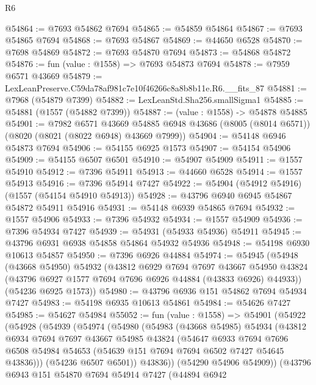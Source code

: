 \begin{lexlean}{R6}
\begin{coremodule}
@54864 := @7693 @54862 @7694
@54865 := @54859 @54864
@54867 := @7693 @54865 @7694
@54868 := @7693 @54867
@54869 := @44650 @6528
@54870 := @7698 @54869
@54872 := @7693 @54870 @7694
@54873 := @54868 @54872
@54876 := fun (value : @1558) => @7693 @54873 @7694
@54878 := @7959 @6571 @43669
@54879 := LexLeanPreserve.C59da78af981c7e10f46266c8a8b8b11e.R6.__fits_87
@54881 := @7968 (@54879 @7399)
@54882 := LexLeanStd.Sha256.smallSigma1
@54885 := @54881 (@1557 (@54882 @7399))
@54887 := (value : @1558) -> @54878 @54885
@54901 := @7982
    @6571
    @43669
    @54885
    @6948
    @43686
    (@8005 (@8014 @6571))
    (@8020 (@8021 (@8022 @6948) @43669 @7999))
@54904 := @54148 @6946 @54873 @7694
@54906 := @54155 @6925 @1573
@54907 := @54154 @54906
@54909 := @54155 @6507 @6501
@54910 := @54907 @54909
@54911 := @1557 @54910
@54912 := @7396 @54911
@54913 := @44660 @6528
@54914 := @1557 @54913
@54916 := @7396 @54914 @7427
@54922 := @54904 (@54912 @54916) (@1557 (@54154 @54910 @54913))
@54928 := @43796 @6940 @6945 @54867 @54872 @54911 @54916
@54931 := @54148 @6939 @54865 @7694
@54932 := @1557 @54906
@54933 := @7396 @54932
@54934 := @1557 @54909
@54936 := @7396 @54934 @7427
@54939 := @54931 (@54933 @54936) @54911
@54945 := @43796 @6931 @6938 @54858 @54864 @54932 @54936
@54948 := @54198 @6930 @10613 @54857
@54950 := @7396 @6926 @44884
@54974 := @54945
    (@54948
      (@43668 @54950)
      @54932
      (@43812
        @6929
        @7694
        @7697
        @43667
        @54950
        @43824
        (@43796 @6927 @1577 @7694 @7696 @6926 @44884 (@43833 @6926) @44933))
      (@54236 @6925 @1573))
@54980 := @43796 @6936 @151 @54862 @7694 @54934 @7427
@54983 := @54198 @6935 @10613 @54861
@54984 := @54626 @7427
@54985 := @54627 @54984
@55052 := fun (value : @1558) =>
  @54901
    (@54922
      (@54928
        (@54939
          (@54974
            (@54980
              (@54983
                (@43668 @54985)
                @54934
                (@43812
                  @6934
                  @7694
                  @7697
                  @43667
                  @54985
                  @43824
                  (@54647
                    @6933
                    @7694
                    @7696
                    @6508
                    @54984
                    @54653
                    (@54639 @151 @7694 @7694 @6502 @7427 @54645 @43836)))
                (@54236 @6507 @6501))
              @43836))
          (@54290 @54906 @54909))
        (@43796
          @6943
          @151
          @54870
          @7694
          @54914
          @7427
          (@44894
            @6942

\end{coremodule}
\end{lexlean}
